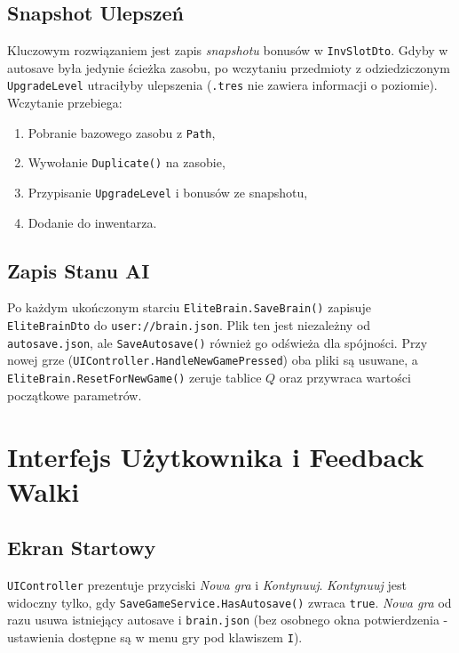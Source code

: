 \subsection{Snapshot Ulepszeń}

Kluczowym rozwiązaniem jest zapis \emph{snapshotu} bonusów w \texttt{InvSlotDto}. Gdyby w autosave była jedynie ścieżka zasobu, po wczytaniu przedmioty z odziedziczonym \texttt{UpgradeLevel} utraciłyby ulepszenia (\texttt{.tres} nie zawiera informacji o poziomie). Wczytanie przebiega:
\begin{enumerate}
    \item Pobranie bazowego zasobu z \texttt{Path},
    \item Wywołanie \texttt{Duplicate()} na zasobie,
    \item Przypisanie \texttt{UpgradeLevel} i bonusów ze snapshotu,
    \item Dodanie do inwentarza.
\end{enumerate}

\subsection{Zapis Stanu AI}

Po każdym ukończonym starciu \texttt{EliteBrain.SaveBrain()} zapisuje \texttt{EliteBrainDto} do \texttt{user://brain.json}. Plik ten jest niezależny od \texttt{autosave.json}, ale \texttt{SaveAutosave()} również go odświeża dla spójności. Przy nowej grze (\texttt{UIController.HandleNewGamePressed}) oba pliki są usuwane, a \texttt{EliteBrain.ResetForNewGame()} zeruje tablice $Q$ oraz przywraca wartości początkowe parametrów.

\section{Interfejs Użytkownika i Feedback Walki}

\subsection{Ekran Startowy}

\texttt{UIController} prezentuje przyciski \textit{Nowa gra} i \textit{Kontynuuj}. \textit{Kontynuuj} jest widoczny tylko, gdy \texttt{SaveGameService.HasAutosave()} zwraca \texttt{true}. \textit{Nowa gra} od razu usuwa istniejący autosave i \texttt{brain.json} (bez osobnego okna potwierdzenia - ustawienia dostępne są w menu gry pod klawiszem \texttt{I}).

